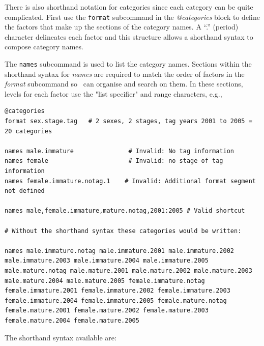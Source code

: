 There is also shorthand notation for categories since each category can be quite complicated\label{sec:Categories}. First use the \texttt{format} subcommand in the \textit{@categories} block to define the factors that make up the sections of the category names. A ``.'' (period) character delineates each factor and this structure allows a shorthand syntax to compose category names.

The \texttt{names} subcommand is used to list the category names. Sections within the shorthand syntax for \textit{names} are required to match the order of factors in the \textit{format} subcommand so \CNAME\ can organise and search on them. In these sections, levels for each factor use the "list specifier" and range characters, e.g.,

{\small{\begin{lstlisting}
@categories
format sex.stage.tag   # 2 sexes, 2 stages, tag years 2001 to 2005 = 20 categories

names male.immature               # Invalid: No tag information
names female                      # Invalid: no stage of tag information
names female.immature.notag.1    # Invalid: Additional format segment not defined

names male,female.immature,mature.notag,2001:2005 # Valid shortcut

# Without the shorthand syntax these categories would be written:

names male.immature.notag male.immature.2001 male.immature.2002 male.immature.2003 male.immature.2004 male.immature.2005 male.mature.notag male.mature.2001 male.mature.2002 male.mature.2003 male.mature.2004 male.mature.2005 female.immature.notag female.immature.2001 female.immature.2002 female.immature.2003 female.immature.2004 female.immature.2005 female.mature.notag female.mature.2001 female.mature.2002 female.mature.2003 female.mature.2004 female.mature.2005
\end{lstlisting}}}

The shorthand syntax available are: 

